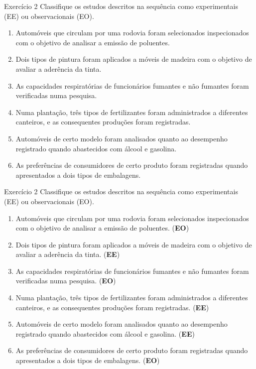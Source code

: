 \documentclass[
  ignorenonframetext,
  serif,
  professionalfont,
  usenames,
  dvipsnames,
  aspectratio = 169]{beamer}
\begin{document}
\begin{frame}{Exercício 2}
\label{exercuxedcio-2-1}
Classifique os estudos descritos na sequência como experimentais (EE) ou
observacionais (EO).

\begin{enumerate}
\item
  Automóveis que circulam por uma rodovia foram selecionados
  inspecionados com o objetivo de analisar a emissão de poluentes.
\item
  Dois tipos de pintura foram aplicados a móveis de madeira com o
  objetivo de avaliar a aderência da tinta.
\item
  As capacidades respiratórias de funcionários fumantes e não fumantes
  foram verificadas numa pesquisa.
\item
  Numa plantação, três tipos de fertilizantes foram administrados a
  diferentes canteiros, e as consequentes produções foram registradas.
\item
  Automóveis de certo modelo foram analisados quanto ao desempenho
  registrado quando abastecidos com álcool e gasolina.
\item
  As preferências de consumidores de certo produto foram registradas
  quando apresentados a dois tipos de embalagens.
\end{enumerate}
\end{frame}

\begin{frame}{Exercício 2}
\label{exercuxedcio-2-2}
Classifique os estudos descritos na sequência como experimentais (EE) ou
observacionais (EO).

\begin{enumerate}
\item
  Automóveis que circulam por uma rodovia foram selecionados
  inspecionados com o objetivo de analisar a emissão de poluentes.
  (\textbf{EO})
\item
  Dois tipos de pintura foram aplicados a móveis de madeira com o
  objetivo de avaliar a aderência da tinta. (\textbf{EE})
\item
  As capacidades respiratórias de funcionários fumantes e não fumantes
  foram verificadas numa pesquisa. (\textbf{EO})
\item
  Numa plantação, três tipos de fertilizantes foram administrados a
  diferentes canteiros, e as consequentes produções foram registradas.
  (\textbf{EE})
\item
  Automóveis de certo modelo foram analisados quanto ao desempenho
  registrado quando abastecidos com álcool e gasolina. (\textbf{EE})
\item
  As preferências de consumidores de certo produto foram registradas
  quando apresentados a dois tipos de embalagens. (\textbf{EO})
\end{enumerate}
\end{frame}
\end{document}
